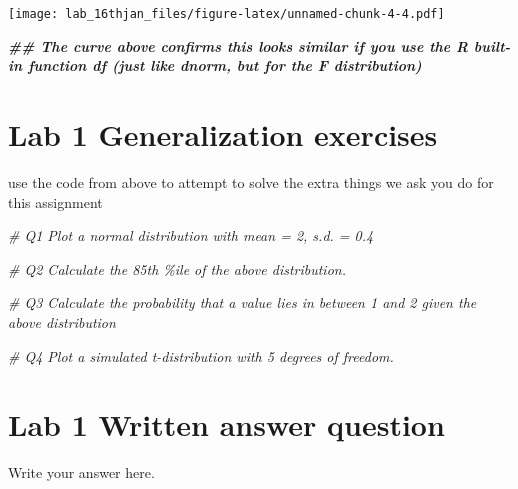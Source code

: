 \documentclass[
]{article}
\newenvironment{Shaded}{\begin{snugshade}}{\end{snugshade}}
\newcommand{\CommentTok}[1]{\textcolor[rgb]{0.56,0.35,0.01}{\textit{#1}}}
\newcommand{\DocumentationTok}[1]{\textcolor[rgb]{0.56,0.35,0.01}{\textbf{\textit{#1}}}}
\begin{document}
\texttt{[image: lab\_16thjan\_files/figure-latex/unnamed-chunk-4-4.pdf]}

\begin{Shaded}
\begin{Highlighting}[]
\DocumentationTok{\#\# The curve above confirms this looks similar if you use the R built{-}in function df (just like dnorm, but for the F distribution)}
\end{Highlighting}
\end{Shaded}

\hypertarget{lab-1-generalization-exercises}{%
\section{Lab 1 Generalization
exercises}\label{lab-1-generalization-exercises}}

use the code from above to attempt to solve the extra things we ask you
do for this assignment

\begin{Shaded}
\begin{Highlighting}[]
\CommentTok{\# Q1 Plot a normal distribution with mean = 2, s.d. = 0.4}


\CommentTok{\# Q2 Calculate the 85th \%ile of the above distribution.}

\CommentTok{\# Q3 Calculate the probability that a value lies in between 1 and 2 given the above distribution}

\CommentTok{\# Q4 Plot a simulated t{-}distribution with 5 degrees of freedom.}
\end{Highlighting}
\end{Shaded}

\hypertarget{lab-1-written-answer-question}{%
\section{Lab 1 Written answer
question}\label{lab-1-written-answer-question}}

Write your answer here.
\end{document}
